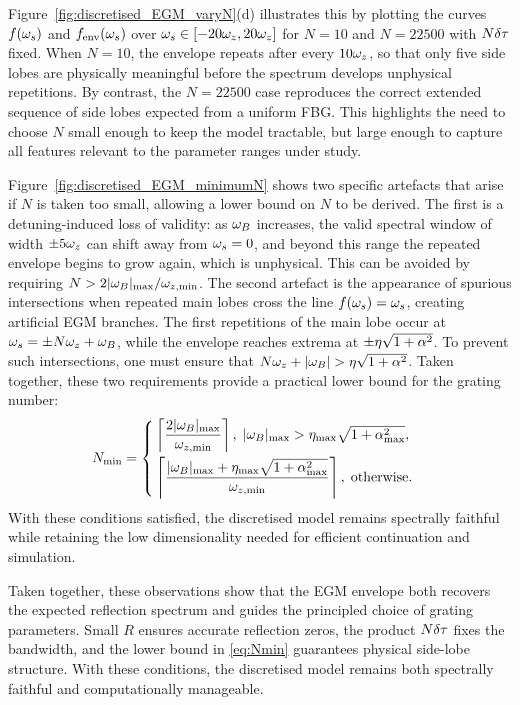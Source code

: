 Figure~\ref{fig:discretised_EGM_varyN}(d) illustrates this by plotting the curves $f(\omega_s)$ and $f_\text{env}(\omega_s)$ over $\omega_s \in [-20\omega_z,20\omega_z]$ for $N=10$ and $N=22500$ with $N\delta \tau$ fixed.  
When $N=10$, the envelope repeats after every $10\omega_z$, so that only five side lobes are physically meaningful before the spectrum develops unphysical repetitions.  
By contrast, the $N=22500$ case reproduces the correct extended sequence of side lobes expected from a uniform FBG.  
This highlights the need to choose $N$ small enough to keep the model tractable, but large enough to capture all features relevant to the parameter ranges under study.
%
\par
%
Figure~\ref{fig:discretised_EGM_minimumN} shows two specific artefacts that arise if $N$ is taken too small, allowing a lower bound on $N$ to be derived.  
The first is a detuning-induced loss of validity: as $\omega_B$ increases, the valid spectral window of width $\pm 5\omega_z$ can shift away from $\omega_s=0$, and beyond this range the repeated envelope begins to grow again, which is unphysical.  
This can be avoided by requiring $N > 2|\omega_B|_{\max}/\omega_{z,\min}$.  
The second artefact is the appearance of spurious intersections when repeated main lobes cross the line $f(\omega_s)=\omega_s$, creating artificial EGM branches.  
The first repetitions of the main lobe occur at $\omega_s = \pm N\omega_z + \omega_B$, while the envelope reaches extrema at $\pm \eta\sqrt{1+\alpha^2}$.  
To prevent such intersections, one must ensure that $N\omega_z + |\omega_B| > \eta\sqrt{1+\alpha^2}$.  
Taken together, these two requirements provide a practical lower bound for the grating number:
%
\begin{equation}
    \label{eq:Nmin}
    N_\text{min} =
    \begin{cases}
    \left\lceil \dfrac{2|\omega_B|_{\max}}{\omega_{z,\min}} \right\rceil, \; |\omega_B|_{\max} > \eta_{\max}\sqrt{1+\alpha_{\max}^2}, \\[2ex]
    \left\lceil \dfrac{|\omega_B|_{\max} + \eta_{\max}\sqrt{1+\alpha_{\max}^2}}{\omega_{z,\min}} \right\rceil, \; \text{otherwise}.
    \end{cases}
\end{equation}
%
With these conditions satisfied, the discretised model remains spectrally faithful while retaining the low dimensionality needed for efficient continuation and simulation.
%
\par
%
Taken together, these observations show that the EGM envelope both recovers the expected reflection spectrum and guides the principled choice of grating parameters.
Small $R$ ensures accurate reflection zeros, the product $N\delta \tau$ fixes the bandwidth, and the lower bound in \eqref{eq:Nmin} guarantees physical side-lobe structure.
With these conditions, the discretised model remains both spectrally faithful and computationally manageable.